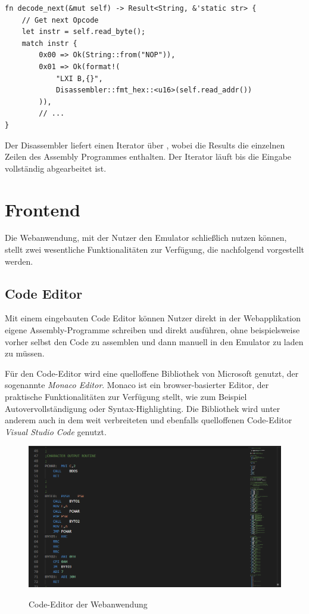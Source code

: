\begin{verbatim}
fn decode_next(&mut self) -> Result<String, &'static str> {
    // Get next Opcode
    let instr = self.read_byte();
    match instr {
        0x00 => Ok(String::from("NOP")),
        0x01 => Ok(format!(
            "LXI B,{}",
            Disassembler::fmt_hex::<u16>(self.read_addr())
        )),
        // ...
}
\end{verbatim}

Der Disassembler liefert einen Iterator über , wobei die Results die einzelnen Zeilen des Assembly Programmes enthalten. Der Iterator läuft bis die Eingabe vollständig abgearbeitet ist.

\section{Frontend}

Die Webanwendung, mit der Nutzer den Emulator schließlich nutzen können, stellt zwei wesentliche Funktionalitäten zur Verfügung, die nachfolgend vorgestellt werden.

\subsection{Code Editor}

Mit einem eingebauten Code Editor können Nutzer direkt in der Webapplikation eigene Assembly-Programme schreiben und direkt ausführen, ohne beispielsweise vorher selbst den Code zu assemblen und dann manuell in den Emulator zu laden zu müssen.

Für den Code-Editor wird eine quelloffene Bibliothek von Microsoft genutzt, der sogenannte \textit{Monaco Editor}. Monaco ist ein browser-basierter Editor, der praktische Funktionalitäten zur Verfügung stellt, wie zum Beispiel Autovervollständigung oder Syntax-Highlighting. Die Bibliothek wird unter anderem auch in dem weit verbreiteten und ebenfalls quelloffenen Code-Editor \textit{Visual Studio Code} genutzt.

\begin{figure}
    \caption{Code-Editor der Webanwendung}
    \centering
    \includegraphics[width=1.0\textwidth]{Bilder/CodeEditor.png}
    \label{fig:codeeditor}
\end{figure}

